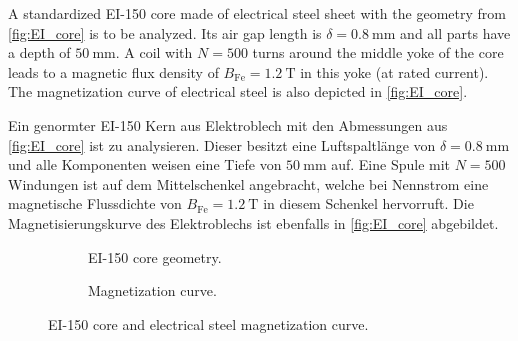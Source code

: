 

A standardized EI-150 core made of electrical steel sheet with the geometry from \autoref{fig:EI_core} is to be analyzed. Its air gap length is $\delta = \SI{0.8}{\milli\metre}$ and all parts have a depth of $\SI{50}{\milli\metre}$. A coil with $N = 500$ turns around the middle yoke of the core leads to a magnetic flux density of $B_{\mathrm{Fe}} = \SI{1.2}{\tesla}$ in this yoke (at rated current). The magnetization curve of electrical steel is also depicted in \autoref{fig:EI_core}.


\begin{germanblock}
    Ein genormter EI-150 Kern aus Elektroblech mit den Abmessungen aus \autoref{fig:EI_core} ist zu analysieren. Dieser besitzt eine Luftspaltlänge von $\delta = \SI{0.8}{\milli\metre}$ und alle Komponenten weisen eine Tiefe von $\SI{50}{\milli\metre}$ auf. Eine Spule mit $N = 500$ Windungen ist auf dem Mittelschenkel angebracht, welche bei Nennstrom eine magnetische Flussdichte von $B_{\mathrm{Fe}} = \SI{1.2}{\tesla}$ in diesem Schenkel hervorruft. Die Magnetisierungskurve des Elektroblechs ist ebenfalls in \autoref{fig:EI_core} abgebildet.
\end{germanblock}

\begin{figure}[htb]
    \begin{subfigure}{.49\textwidth}
        \centering
        
        \caption{EI-150 core geometry.}
        \label{fig:EI_core_sketch}
    \end{subfigure}
    \begin{subfigure}{.49\textwidth}
        \centering
        
        \caption{Magnetization curve.}
        \label{fig:magnetization_curve}
    \end{subfigure}
    \caption{EI-150 core and electrical steel magnetization curve.}
    \label{fig:EI_core}
\end{figure}





